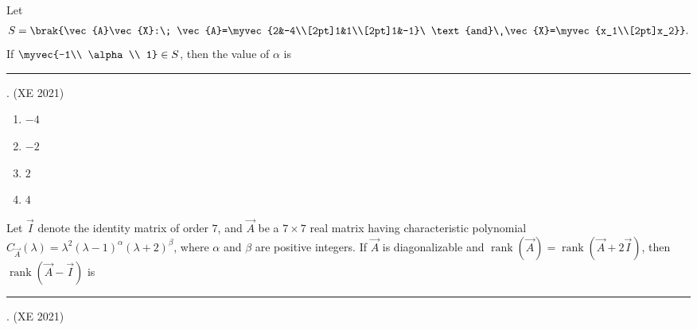 \item Let
\begin{align*}
    S=\brak{\vec{A}\vec{X}:\; \vec{A}=\myvec{2&-4\\[2pt]1&1\\[2pt]1&-1}\ \text{and}\ \vec{X}=\myvec{x_1\\[2pt]x_2}}.
\end{align*}
If \(\myvec{-1\\ \alpha\\ 1}\in S\), then the value of \(\alpha\) is
\rule{1cm}{0.01pt}.
\hfill(XE 2021)
\begin{multicols}{4}
\begin{enumerate}
\item $-4$
\item $-2$
\item $2$
\item $4$
\end{enumerate}
\end{multicols}
\item
Let $\vec{I}$ denote the identity matrix of order $7$, and $\vec{A}$ be a $7\times 7$ real matrix having characteristic polynomial $C_\vec{A}(\lambda)=\lambda^{2}(\lambda-1)^{\alpha}(\lambda+2)^{\beta}$, where $\alpha$ and $\beta$ are positive integers. If $\vec{A}$ is diagonalizable and $\operatorname{rank}(\vec{A})=\operatorname{rank}(\vec{A}+2\vec{I})$, then $\operatorname{rank}(\vec{A}-\vec{I})$ is \rule{2.5cm}{0.15mm}.
\hfill(XE 2021)

